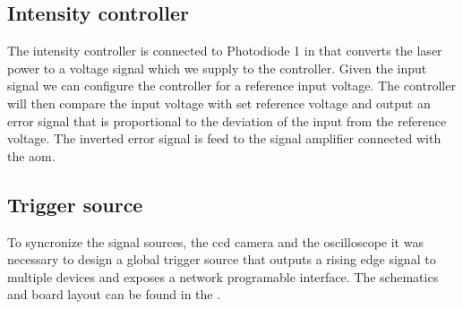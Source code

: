 \subsection{Intensity controller}

The intensity controller is connected to Photodiode 1 in
 that converts the laser power to a voltage
signal which we supply to the controller. Given the input signal we can
configure the controller for a reference input voltage. The controller will
then compare the input voltage with set reference voltage and output an error
signal that is proportional to the deviation of the input from the reference
voltage. The inverted error signal is feed to the signal amplifier connected
with the \gls{aom}.

\subsection{Trigger source}

To syncronize the signal sources, the \gls{ccd} camera and the oscilloscope
it was necessary to design a global trigger source that outputs a rising edge
signal to multiple devices and exposes a network programable interface.
The schematics and board layout can be found in the
.
